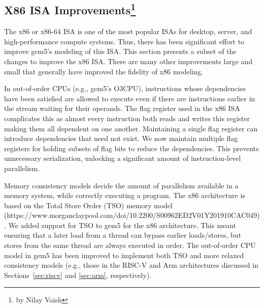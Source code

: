 \subsection[X86 ISA Improvements]{X86 ISA Improvements\footnote{by Nilay Vaish}}
\label{sec:x86}

The x86 or x86-64 ISA is one of the most popular ISAs for desktop, server, and high-performance compute systems.
Thus, there has been significant effort to improve gem5's modeling of this ISA.
This section presents a subset of the changes to improve the x86 ISA.
There are many other improvements large and small that generally have improved the fidelity of x86 modeling.

In out-of-order CPUs (e.g., gem5's O3CPU), instructions whose dependencies have been satisfied are allowed to execute even if there are instructions earlier in the stream waiting for their operands.
The flag register used in the x86 ISA complicates this as almost every instruction both reads and writes this register making them all dependent on one another.
Maintaining a single flag register can introduce dependencies that need not exist.
We now maintain multiple flag registers for holding subsets of flag bits to reduce the dependencies.
This prevents unnecessary serialization, unlocking a significant amount of instruction-level parallelism.

Memory consistency models decide the amount of parallelism available in a memory system, while correctly executing a program.
The x86 architecture is based on the Total Store Order (TSO) memory model~\cite{NagarajanSorin2020-cohMCMPrimer} (https://www.morganclaypool.com/doi/10.2200/S00962ED2V01Y201910CAC049).
We added support for TSO to gem5 for the x86 architecture.
This meant ensuring that a later load from a thread can bypass earlier loads/stores, but stores from the same thread are always executed in order.
The out-of-order CPU model in gem5 has been improved to implement both TSO and more relaxed consistency models (e.g., those in the RISC-V and Arm architectures discussed in Sections~\ref{sec:riscv} and \ref{sec:arm}, respectively).
